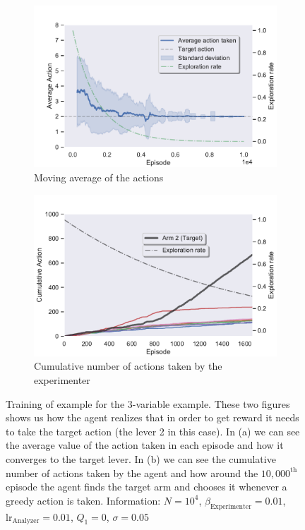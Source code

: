 \documentclass[11pt,a4paper,twoside]{report}
\newcommand{\+}{\textnormal{+} }
\theoremstyle{definition}
\numberwithin{equation}{chapter}
\begin{document}
    \begin{figure}[]
      \centering
      \begin{subfigure}{.5\textwidth}
        \centering
        \includegraphics[width=1\linewidth]{figures/Actions-MAB4.pdf}
        \caption{Moving average of the actions}
        \label{fig:ActionAverageMAB4}
      \end{subfigure}%
      \begin{subfigure}{.5\textwidth}
        \centering
        \includegraphics[width=1\linewidth]{figures/Cum-action-MAB4.pdf}
        \caption{Cumulative number of actions taken by the experimenter}
        \label{fig:actionsMAB4}
      \end{subfigure}
      \caption{Training of example for the 3-variable example. These two figures
      shows us how the agent realizes that in order to get reward it needs to
      take the target action (the lever 2 in this case). In (a) we can see the
      average value of the action taken in each episode and how it converges to
      the target lever. In (b) we can see the cumulative number of actions taken
      by the agent and how around the $10,000^\text{th}$ episode the agent finds
      the target arm and chooses it whenever a greedy action is taken.
      Information: $N=10^4$, $\beta_\text{Experimenter}=0.01$,
      $\text{lr}_\text{Analyzer}=0.01$, $Q_1=0$, $\sigma=0.05$}
    \end{figure}
\end{document}
